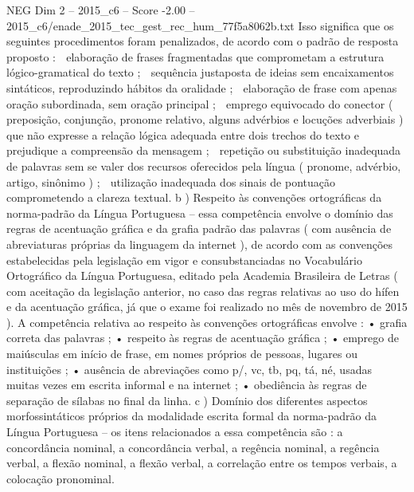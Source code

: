 \begin{textsample}{NEG Dim 2 – 2015\_c6 – Score -2.00 – 2015\_c6/enade\_2015\_tec\_gest\_rec\_hum\_77f5a8062b.txt}
Isso significa que os seguintes procedimentos foram penalizados, de acordo com o padrão de resposta proposto :  elaboração de frases fragmentadas que comprometam a estrutura lógico-gramatical do texto ;  sequência justaposta de ideias sem encaixamentos sintáticos, reproduzindo hábitos da oralidade ;  elaboração de frase com apenas oração subordinada, sem oração principal ;  emprego equivocado do conector ( preposição, conjunção, pronome relativo, alguns advérbios e locuções adverbiais ) que não expresse a relação lógica adequada entre dois trechos do texto e prejudique a compreensão da mensagem ;  repetição ou substituição inadequada de palavras sem se valer dos recursos oferecidos pela língua ( pronome, advérbio, artigo, sinônimo ) ;  utilização inadequada dos sinais de pontuação comprometendo a clareza textual. b ) Respeito às convenções ortográficas da norma-padrão da Língua Portuguesa – essa competência envolve o domínio das regras de acentuação gráfica e da grafia padrão das palavras ( com ausência de abreviaturas próprias da linguagem da internet ), de acordo com as convenções estabelecidas pela legislação em vigor e consubstanciadas no Vocabulário Ortográfico da Língua Portuguesa, editado pela Academia Brasileira de Letras ( com aceitação da legislação anterior, no caso das regras relativas ao uso do hífen e da acentuação gráfica, já que o exame foi realizado no mês de novembro de 2015 ).
A competência relativa ao respeito às convenções ortográficas envolve : • grafia correta das palavras ; • respeito às regras de acentuação gráfica ; • emprego de maiúsculas em início de frase, em nomes próprios de pessoas, lugares ou instituições ; • ausência de abreviações como p/, vc, tb, pq, tá, né, usadas muitas vezes em escrita informal e na internet ; • obediência às regras de separação de sílabas no final da linha. c ) Domínio dos diferentes aspectos morfossintáticos próprios da modalidade escrita formal da norma-padrão da Língua Portuguesa – os itens relacionados a essa competência são : a concordância nominal, a concordância verbal, a regência nominal, a regência verbal, a flexão nominal, a flexão verbal, a correlação entre os tempos verbais, a colocação pronominal.

\end{textsample}
